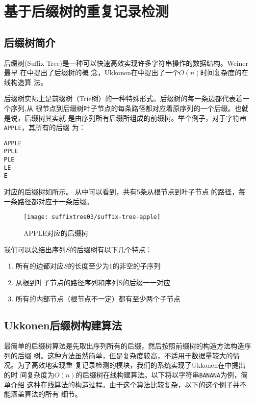 
\chapter{基于后缀树的重复记录检测}
\label{chap:suffixtree}

\section{后缀树简介}
\label{sec:suffixtreeintro}
后缀树(Suffix Tree)是一种可以快速高效实现许多字符串操作的数据结构。Weiner最早
在中提出了后缀树的概
念，Ukkonen在中提出了一个$O(n)$时间复杂度的在线构造算
法。

后缀树实际上是前缀树（Trie树）的一种特殊形式。后缀树的每一条边都代表着一个序列,从
根节点到后缀树叶子节点的每条路径都对应着原序列的一个后缀。也就是说，后缀树其实就
是由序列所有后缀所组成的前缀树。举个例子，对于字符串\texttt{APPLE}，其所有的后缀
为：
\begin{verbatim}
APPLE
PPLE
PLE
LE
E
\end{verbatim}
对应的后缀树如所示。
从中可以看到，共有5条从根节点到叶子节点
的路径，每一条路径都对应于一条后缀。
\begin{figure}[h]
  \centering
  \texttt{[image: suffixtree03/suffix-tree-apple]}
  \caption{APPLE对应的后缀树}
  \label{suffixtree:fig:suffix-tree-apple}
\end{figure}

我们可以总结出序列$S$的后缀树有以下几个特点：
\begin{enumerate}
\item 所有的边都对应$S$的长度至少为1的非空的子序列
\item 从根到叶子节点的路径序列和序列S的后缀一一对应
\item 所有的内部节点（根节点不一定）都有至少两个子节点
\end{enumerate}

\section{Ukkonen后缀树构建算法}
\label{sec:ukkonen}
最简单的后缀树算法是先取出序列所有的后缀，然后按照前缀树的构造方法构造序列的后缀
树。这种方法虽然简单，但是复杂度较高，不适用于数据量较大的情况。为了高效地实现重
复记录检测的模块，我们的系统实现了Ukkonen在中提出的时
间复杂度为$O(n)$的后缀树在线构建算法。以下将以字符串\texttt{BANANA}为例，简单介绍
这种在线算法的构造过程。由于这个算法比较复杂，以下的这个例子并不能涵盖算法的所有
细节。

